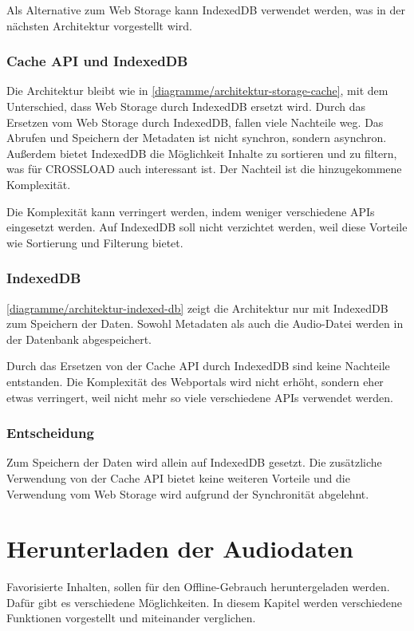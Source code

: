 Als Alternative zum Web Storage kann IndexedDB verwendet werden, was in der nächsten Architektur vorgestellt wird.

\subsubsection{Cache API und IndexedDB}
Die Architektur bleibt wie in \autoref{diagramme/architektur-storage-cache}, mit dem Unterschied, dass Web Storage durch IndexedDB ersetzt wird. Durch das Ersetzen vom Web Storage durch IndexedDB, fallen viele Nachteile weg. Das Abrufen und Speichern der Metadaten ist nicht synchron, sondern asynchron. Außerdem bietet IndexedDB die Möglichkeit Inhalte zu sortieren und zu filtern, was für CROSSLOAD auch interessant ist. Der Nachteil ist die hinzugekommene Komplexität. 

Die Komplexität kann verringert werden, indem weniger verschiedene \acp{API} eingesetzt werden. Auf IndexedDB soll nicht verzichtet werden, weil diese Vorteile wie Sortierung und Filterung bietet. 

\subsubsection{IndexedDB}
\autoref{diagramme/architektur-indexed-db} zeigt die Architektur nur mit IndexedDB zum Speichern der Daten. Sowohl Metadaten als auch die Audio-Datei werden in der Datenbank abgespeichert. 


Durch das Ersetzen von der Cache \ac{API} durch IndexedDB sind keine Nachteile entstanden. Die Komplexität des Webportals wird nicht erhöht, sondern eher etwas verringert, weil nicht mehr so viele verschiedene \acp{API} verwendet werden.

\subsubsection{Entscheidung}
Zum Speichern der Daten wird allein auf IndexedDB gesetzt. Die zusätzliche Verwendung von der Cache \ac{API} bietet keine weiteren Vorteile und die Verwendung vom Web Storage wird aufgrund der Synchronität abgelehnt.  

\clearpage

\section{Herunterladen der Audiodaten}
Favorisierte Inhalten, sollen für den Offline-Gebrauch heruntergeladen werden. Dafür gibt es verschiedene Möglichkeiten. In diesem Kapitel werden verschiedene Funktionen vorgestellt und miteinander verglichen. 

